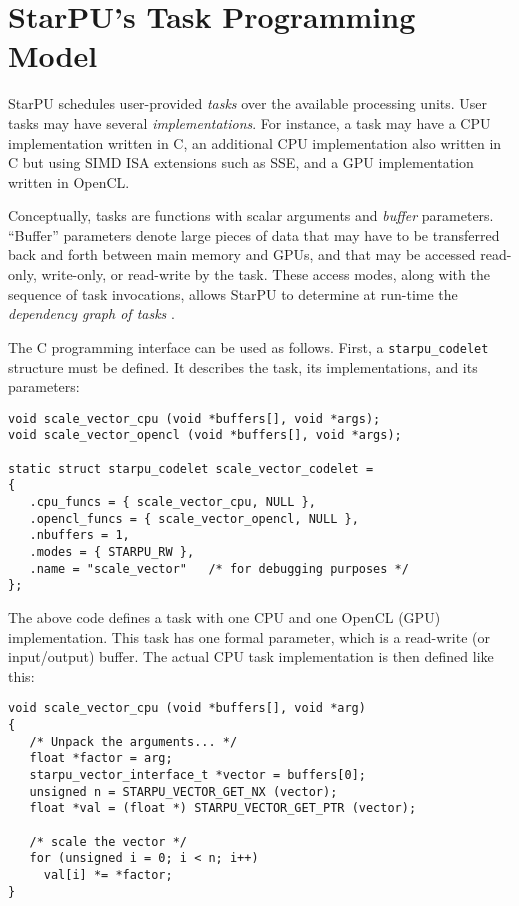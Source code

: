 \documentclass[twoside, a4paper, 10pt]{article}
\begin{document}
\section{StarPU's Task Programming Model}
\label{sec-2}


StarPU schedules user-provided \emph{tasks} over the available processing
units.  User tasks may have several \emph{implementations}.  For instance,
a task may have a CPU implementation written in C, an additional CPU
implementation also written in C but using SIMD ISA extensions such as
SSE, and a GPU implementation written in OpenCL.

Conceptually, tasks are functions with scalar arguments
and \emph{buffer} parameters.  ``Buffer'' parameters denote large pieces of data
that may have to be transferred back and forth between main memory and
GPUs, and that may be accessed read-only, write-only, or read-write
by the task.  These access modes, along with the sequence of task
invocations, allows StarPU to determine at run-time the \emph{dependency graph of tasks} \cite{AugThiNamWac09Europar}.

The C programming interface can be used as follows.  First, a
\texttt{starpu\_codelet} structure must be defined.  It describes the task, its
implementations, and its parameters:


\begin{verbatim}
void scale_vector_cpu (void *buffers[], void *args);
void scale_vector_opencl (void *buffers[], void *args);

static struct starpu_codelet scale_vector_codelet =
{
   .cpu_funcs = { scale_vector_cpu, NULL },
   .opencl_funcs = { scale_vector_opencl, NULL },
   .nbuffers = 1,
   .modes = { STARPU_RW },
   .name = "scale_vector"   /* for debugging purposes */
};
\end{verbatim}

The above code defines a task with one CPU and one OpenCL (GPU)
implementation.  This task has one formal parameter, which is a
read-write (or input/output) buffer.  The actual CPU task implementation
is then defined like this:


\begin{verbatim}
void scale_vector_cpu (void *buffers[], void *arg)
{
   /* Unpack the arguments... */
   float *factor = arg;
   starpu_vector_interface_t *vector = buffers[0];
   unsigned n = STARPU_VECTOR_GET_NX (vector);
   float *val = (float *) STARPU_VECTOR_GET_PTR (vector);

   /* scale the vector */
   for (unsigned i = 0; i < n; i++)
     val[i] *= *factor;
}
\end{verbatim}
\end{document}
